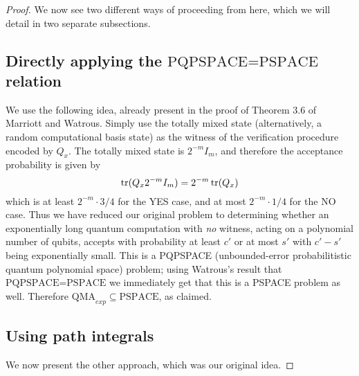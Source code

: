 \documentclass[english]{article}
\numberwithin{equation}{section}
\numberwithin{figure}{section}
\theoremstyle{plain}
\theoremstyle{definition}
\theoremstyle{plain}
\theoremstyle{definition}
\theoremstyle{remark}
\theoremstyle{remark}
\theoremstyle{plain}
\begin{document}
\begin{proof}
We now see two different ways of proceeding from here, which we will detail in two separate subsections.

\subsection{Directly applying the $\text{PQPSPACE=PSPACE}$ relation}
We use the following idea, already present in the proof of Theorem 3.6 of Marriott and Watrous. Simply use the totally mixed state (alternatively, a random computational basis state) as the witness of the verification procedure encoded by $Q_x$. The totally mixed state is $2^{-m}I_m$, and therefore the acceptance probability is given by
\begin{equation}
\operatorname{tr}(Q_x 2^{-m}I_m) = 2^{-m} \operatorname{tr}(Q_x)
\end{equation}
which is at least $2^{-m} \cdot 3/4$ for the YES case, and at most $2^{-m} \cdot 1/4$ for the NO case. Thus we have reduced our original problem to determining whether an exponentially long quantum computation with \emph{no} witness, acting on a polynomial number of qubits, accepts with probability at least $c'$ or at most $s'$ with $c' - s'$ being exponentially small. This is a PQPSPACE (unbounded-error probabilitistic quantum polynomial space) problem; using Watrous's result that $\text{PQPSPACE=PSPACE}$ we immediately get that this is a PSPACE problem as well. Therefore $\text{QMA}_{exp} \subseteq \text{PSPACE}$, as claimed.

\subsection{Using path integrals}
We now present the other approach, which was our original idea. 


\end{proof}
\end{document}
